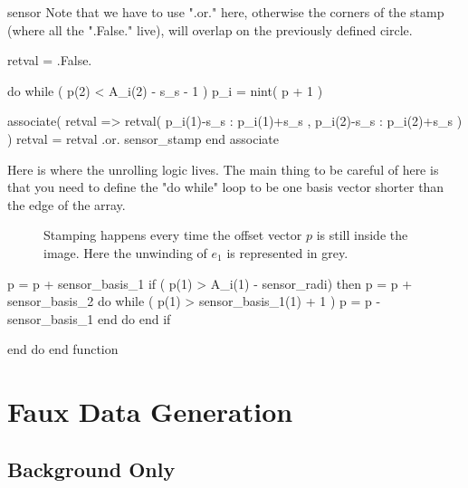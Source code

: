 \documentclass[10pt, a4paper]{article}
\begin{document}
\begin{codeblock}{sensor}
Note that we have to use ".or." here, otherwise the corners of the stamp (where all the ".False." live), will overlap on the previously defined circle.


\begin{code}
	retval = .False.
	
	do while ( p(2) < A_i(2) - s_s - 1 )
		p_i = nint( p + 1 )
		
		associate( retval => retval( p_i(1)-s_s : p_i(1)+s_s , p_i(2)-s_s : p_i(2)+s_s ) )
			retval = retval .or. sensor_stamp
		end associate 
			
\end{code}

Here is where the unrolling logic lives. The main thing to be careful of here is that you need to define the "do while" loop to be one basis vector shorter than the edge of the array. 

\begin{figure}[h]
\centering
{}
\caption{Stamping happens every time the offset vector $p$ is still inside the image. Here the unwinding of $e_1$ is represented in grey.}
\end{figure}

\begin{code}
		p = p + sensor_basis_1
		if ( p(1) > A_i(1) - sensor_radi) then 
			p = p + sensor_basis_2 
			do while ( p(1) > sensor_basis_1(1) + 1  )
				p = p - sensor_basis_1
			end do 
		end if 
		
	end do 
end function
\end{code}
\end{codeblock}
 
\section{Faux Data Generation}

\subsection{Background Only}
\end{document}
